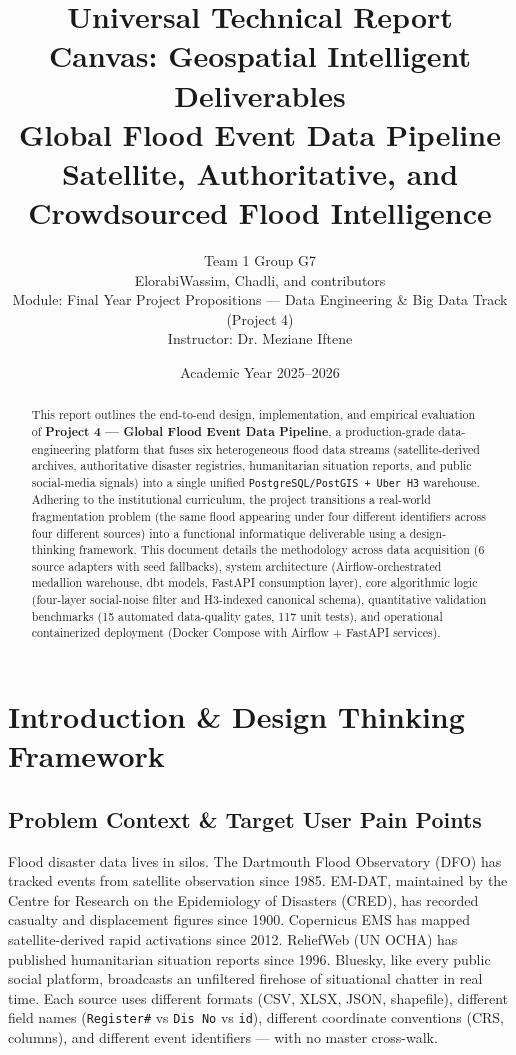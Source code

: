 \documentclass[11pt,a4paper]{article}
\title{Universal Technical Report Canvas: Geospatial Intelligent Deliverables\\[0.5em]
\large Global Flood Event Data Pipeline\\
\small Satellite, Authoritative, and Crowdsourced Flood Intelligence}
\author{Team 1 \textbar{} Group G7 \\
ElorabiWassim, Chadli, and contributors \\
Module: Final Year Project Propositions --- Data Engineering \& Big Data Track (Project 4) \\
Instructor: Dr. Meziane Iftene}
\date{Academic Year 2025--2026}
\begin{document}
\maketitle

\begin{abstract}
This report outlines the end-to-end design, implementation, and empirical
evaluation of \textbf{Project 4 --- Global Flood Event Data Pipeline}, a
production-grade data-engineering platform that fuses six heterogeneous flood
data streams (satellite-derived archives, authoritative disaster registries,
humanitarian situation reports, and public social-media signals) into a single
unified \texttt{PostgreSQL/PostGIS + Uber H3} warehouse. Adhering to the
institutional curriculum, the project transitions a real-world fragmentation
problem (the same flood appearing under four different identifiers across four
different sources) into a functional informatique deliverable using a
design-thinking framework. This document details the methodology across data
acquisition (6 source adapters with seed fallbacks), system architecture
(Airflow-orchestrated medallion warehouse, dbt models, FastAPI consumption
layer), core algorithmic logic (four-layer social-noise filter and
H3-indexed canonical schema), quantitative validation benchmarks (15 automated
data-quality gates, 117 unit tests), and operational containerized deployment
(Docker Compose with Airflow + FastAPI services).
\end{abstract}

\newpage
\tableofcontents
\newpage

\section{Introduction \& Design Thinking Framework}

\subsection{Problem Context \& Target User Pain Points}

Flood disaster data lives in silos. The Dartmouth Flood Observatory (DFO) has
tracked events from satellite observation since 1985. EM-DAT, maintained by
the Centre for Research on the Epidemiology of Disasters (CRED), has recorded
casualty and displacement figures since 1900. Copernicus EMS has mapped
satellite-derived rapid activations since 2012. ReliefWeb (UN OCHA) has
published humanitarian situation reports since 1996. Bluesky, like every
public social platform, broadcasts an unfiltered firehose of situational
chatter in real time. Each source uses different formats (CSV, XLSX, JSON,
shapefile), different field names (\texttt{Register\#} vs \texttt{Dis No} vs
\texttt{id}), different coordinate conventions (CRS, columns), and different
event identifiers --- with no master cross-walk.
\end{document}
